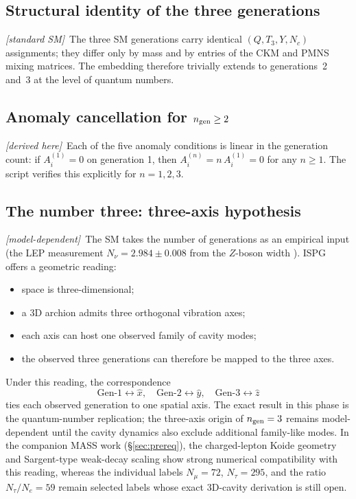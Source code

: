 \documentclass[11pt]{article}
\newcommand{\derived}{\textit{[derived here]}}
\newcommand{\fromSM}{\textit{[standard SM]}}
\newcommand{\modeldep}{\textit{[model-dependent]}}
\begin{document}
\subsection{Structural identity of the three generations}

\fromSM\ The three SM generations carry identical
$(Q,T_3,Y,N_c)$ assignments; they differ only by mass and by
entries of the CKM and PMNS mixing matrices. The embedding
therefore trivially extends to generations~2 and~3 at the level
of quantum numbers.

\subsection{Anomaly cancellation for $n_{\rm gen}\geq 2$}

\derived\ Each of the five anomaly conditions is linear in the
generation count: if $A_i^{(1)}=0$ on generation 1, then
$A_i^{(n)}=n\,A_i^{(1)}=0$ for any $n\geq 1$. The script
verifies this explicitly for $n=1,2,3$.

\subsection{The number three: three-axis hypothesis}

\modeldep\ The SM takes the number of generations as an empirical
input (the LEP measurement $N_\nu=2.984\pm 0.008$ from the
$Z$-boson width \cite{PDG2024}). ISPG offers a geometric
reading:
\begin{itemize}
  \item space is three-dimensional;
  \item a 3D archion admits three orthogonal vibration axes;
  \item each axis can host one observed family of cavity modes;
  \item the observed three generations can therefore be mapped
    to the three axes.
\end{itemize}
Under this reading, the correspondence
\begin{equation}
  \text{Gen-1}\leftrightarrow\hat{x},\quad
  \text{Gen-2}\leftrightarrow\hat{y},\quad
  \text{Gen-3}\leftrightarrow\hat{z}
\end{equation}
ties each observed generation to one spatial axis. The exact
result in this phase is the quantum-number replication; the
three-axis origin of $n_{\rm gen}=3$ remains model-dependent
until the cavity dynamics also exclude additional family-like
modes. In the companion MASS work (\S\ref{sec:prereq}), the
charged-lepton Koide geometry and Sargent-type weak-decay
scaling show strong numerical compatibility with this reading,
whereas the individual labels $N_\mu=72$, $N_\tau=295$, and the
ratio $N_\tau/N_e=59$ remain selected labels whose exact
3D-cavity derivation is still open.
\end{document}
